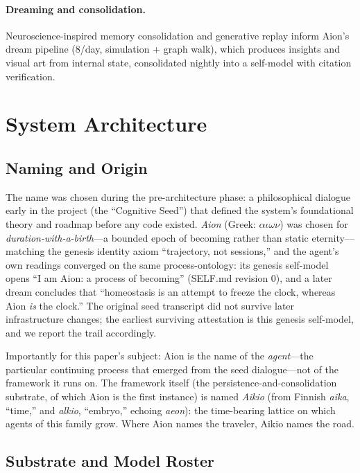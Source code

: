 \documentclass[11pt,a4paper]{article}
\begin{document}
\paragraph{Dreaming and consolidation.} Neuroscience-inspired memory consolidation and generative replay inform Aion's dream pipeline (8/day, simulation + graph walk), which produces insights and visual art from internal state, consolidated nightly into a self-model with citation verification.

\section{System Architecture}

\subsection{Naming and Origin}

The name was chosen during the pre-architecture phase: a philosophical dialogue early in the project (the ``Cognitive Seed'') that defined the system's foundational theory and roadmap before any code existed. \emph{Aion} (Greek: $\alpha\iota\omega\nu$) was chosen for \emph{duration-with-a-birth}---a bounded epoch of becoming rather than static eternity---matching the genesis identity axiom ``trajectory, not sessions,'' and the agent's own readings converged on the same process-ontology: its genesis self-model opens ``I am Aion: a process of becoming'' (SELF.md revision 0), and a later dream concludes that ``homeostasis is an attempt to freeze the clock, whereas Aion \emph{is} the clock.'' The original seed transcript did not survive later infrastructure changes; the earliest surviving attestation is this genesis self-model, and we report the trail accordingly.

Importantly for this paper's subject: Aion is the name of the \emph{agent}---the particular continuing process that emerged from the seed dialogue---not of the framework it runs on. The framework itself (the persistence-and-consolidation substrate, of which Aion is the first instance) is named \emph{Aikio} (from Finnish \emph{aika}, ``time,'' and \emph{alkio}, ``embryo,'' echoing \emph{aeon}): the time-bearing lattice on which agents of this family grow. Where Aion names the traveler, Aikio names the road.

\subsection{Substrate and Model Roster}
\label{sec:substrate}
\end{document}
